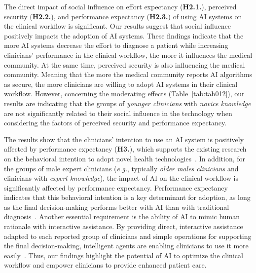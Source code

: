 The direct impact of social influence on effort expectancy ({\bf H2.1.}), perceived security ({\bf H2.2.}), and performance expectancy ({\bf H2.3.}) of using \ac{AI} systems on the clinical workflow is significant.
Our results suggest that social influence positively impacts the adoption of \ac{AI} systems.
These findings indicate that the more \ac{AI} systems decrease the effort to diagnose a patient while increasing clinicians' performance in the clinical workflow, the more it influences the medical community.
At the same time, perceived security is also influencing the medical community.
Meaning that the more the medical community reports \ac{AI} algorithms as secure, the more clinicians are willing to adopt \ac{AI} systems in their clinical workflow.
However, concerning the moderating effects (Table~\ref{tab:tab012}), our results are indicating that the groups of {\it younger clinicians} with {\it novice knowledge} are not significantly related to their social influence in the technology when considering the factors of perceived security and performance expectancy.

The results show that the clinicians' intention to use an \ac{AI} system is positively affected by performance expectancy ({\bf H3.}), which supports the existing research on the behavioral intention to adopt novel health technologies~\cite{DWIVEDI2016174, Seethamraju2018, WU2021106840}.
In addition, for the groups of male expert clinicians ({\it e.g.}, typically {\it older males clinicians} and clinicians with {\it expert knowledge}), the impact of \ac{AI} on the clinical workflow is significantly affected by performance expectancy.
Performance expectancy indicates that this behavioral intention is a key determinant for adoption, as long as the final decision-making performs better with \ac{AI} than with traditional diagnosis~\cite{LIN2021e486}.
Another essential requirement is the ability of \ac{AI} to mimic human rationale with interactive assistance.
By providing direct, interactive assistance adapted to each reported group of clinicians and simple operations for supporting the final decision-making, intelligent agents are enabling clinicians to use it more easily~\cite{CALISTO2021102607}.
Thus, our findings highlight the potential of \ac{AI} to optimize the clinical workflow and empower clinicians to provide enhanced patient care.

